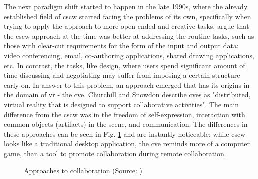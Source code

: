 The next paradigm shift started to happen in the late 1990s, where the already established field of \gls{cscw} started facing the problems of its own, specifically when trying to apply the approach to more open-ended and creative tasks. \cite{churchill_collaborative_1998} argue that the \gls{cscw} approach at the time was better at addressing the routine tasks, such as those with clear-cut requirements for the form of the input and output data: video conferencing, email, co-authoring applications, shared drawing applications, etc. In contrast, the tasks, like design, where users spend significant amount of time discussing and negotiating may suffer from imposing a certain structure early on. In answer to this problem, an approach emerged that has its origins in the domain of \gls{vr} - the \gls{cve}. Churchill and Snowdon describe \gls{cve}s as "distributed, virtual reality that is designed to support collaborative activities". The main difference from the \gls{cscw} was in the freedom of self-expression, interaction with common objects (artifacts) in the scene, and communication. The differences in these approaches can be seen in Fig. \ref{fig:approaches_to_collaboration} and are instantly noticeable: while \gls{cscw} looks like a traditional desktop application, the \gls{cve} reminds more of a computer game, than a tool to promote collaboration during remote collaboration. 

\begin{figure}
	\centering
	\hfill
	\hfill
	\hfill
	\caption{Approaches to collaboration (Source: \cite{churchill_collaborative_1998})}
	\label{fig:approaches_to_collaboration}
\end{figure}

